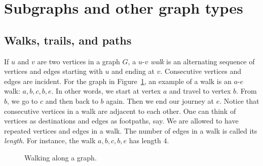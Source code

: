 
\section{Subgraphs and other graph types}



\subsection{Walks, trails, and paths}

If $u$ and $v$ are two vertices in a graph $G$, a $u$-$v$ \emph{walk}
is an alternating sequence of vertices and edges starting with $u$ and
ending at $v$. Consecutive vertices and edges are incident. For the
graph in Figure~\ref{fig:introduction:types_of_walks}, an example of a
walk is an $a$-$e$ walk: $a, b, c, b, e$. In other words, we
start at vertex $a$ and travel to vertex $b$. From $b$, we go to $c$
and then back to $b$ again. Then we end our journey at $e$. Notice
that consecutive vertices in a walk are adjacent to each other. One
can think of vertices as destinations and edges as footpaths, say. We
are allowed to have repeated vertices and edges in a walk. The number
of edges in a walk is called its \emph{length}. For instance, the
walk $a, b, c, b, e$ has length $4$.

\begin{figure}[!htbp]
\centering
{}
\caption{Walking along a graph.}
\label{fig:introduction:types_of_walks}
\end{figure}

